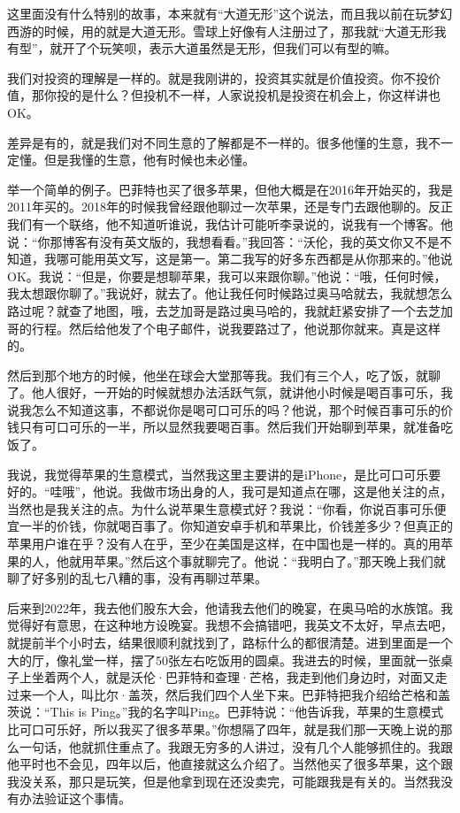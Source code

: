 
这里面没有什么特别的故事，本来就有“大道无形”这个说法，而且我以前在玩梦幻西游的时候，用的就是大道无形。雪球上好像有人注册过了，那我就“大道无形我有型”，就开了个玩笑呗，表示大道虽然是无形，但我们可以有型的嘛。



我们对投资的理解是一样的。就是我刚讲的，投资其实就是价值投资。你不投价值，那你投的是什么？但投机不一样，人家说投机是投资在机会上，你这样讲也OK。

差异是有的，就是我们对不同生意的了解都是不一样的。很多他懂的生意，我不一定懂。但是我懂的生意，他有时候也未必懂。

举一个简单的例子。巴菲特也买了很多苹果，但他大概是在2016年开始买的，我是2011年买的。2018年的时候我曾经跟他聊过一次苹果，还是专门去跟他聊的。反正我们有一个联络，他不知道听谁说，我估计可能听李录说的，说我有一个博客。他说：“你那博客有没有英文版的，我想看看。”我回答：“沃伦，我的英文你又不是不知道，我哪可能用英文写，这是第一。第二我写的好多东西都是从你那来的。”他说OK。我说：“但是，你要是想聊苹果，我可以来跟你聊。”他说：“哦，任何时候，我太想跟你聊了。”我说好，就去了。他让我任何时候路过奥马哈就去，我就想怎么路过呢？就查了地图，哦，去芝加哥是路过奥马哈的，我就赶紧安排了一个去芝加哥的行程。然后给他发了个电子邮件，说我要路过了，他说那你就来。真是这样的。

然后到那个地方的时候，他坐在球会大堂那等我。我们有三个人，吃了饭，就聊了。他人很好，一开始的时候就想办法活跃气氛，就讲他小时候是喝百事可乐，我说我怎么不知道这事，不都说你是喝可口可乐的吗？他说，那个时候百事可乐的价钱只有可口可乐的一半，所以显然我要喝百事。然后我们开始聊到苹果，就准备吃饭了。

我说，我觉得苹果的生意模式，当然我这里主要讲的是iPhone，是比可口可乐要好的。“哇哦”，他说。我做市场出身的人，我可是知道点在哪，这是他关注的点，当然也是我关注的点。为什么说苹果生意模式好？我说：“你看，你说百事可乐便宜一半的价钱，你就喝百事了。你知道安卓手机和苹果比，价钱差多少？但真正的苹果用户谁在乎？没有人在乎，至少在美国是这样，在中国也是一样的。真的用苹果的人，他就用苹果。”然后这个事就聊完了。他说：“我明白了。”那天晚上我们就聊了好多别的乱七八糟的事，没有再聊过苹果。

后来到2022年，我去他们股东大会，他请我去他们的晚宴，在奥马哈的水族馆。我觉得好有意思，在这种地方设晚宴。我想不会搞错吧，我英文不太好，早点去吧，就提前半个小时去，结果很顺利就找到了，路标什么的都很清楚。进到里面是一个大的厅，像礼堂一样，摆了50张左右吃饭用的圆桌。我进去的时候，里面就一张桌子上坐着两个人，就是沃伦·巴菲特和查理·芒格，我走到他们身边时，对面又走过来一个人，叫比尔·盖茨，然后我们四个人坐下来。巴菲特把我介绍给芒格和盖茨说：“This is Ping。”我的名字叫Ping。巴菲特说：“他告诉我，苹果的生意模式比可口可乐好，所以我买了很多苹果。”你想隔了四年，就是我们那一天晚上说的那么一句话，他就抓住重点了。我跟无穷多的人讲过，没有几个人能够抓住的。我跟他平时也不会见，四年以后，他直接就这么介绍了。当然他买了很多苹果，这个跟我没关系，那只是玩笑，但是他拿到现在还没卖完，可能跟我是有关的。当然我没有办法验证这个事情。

